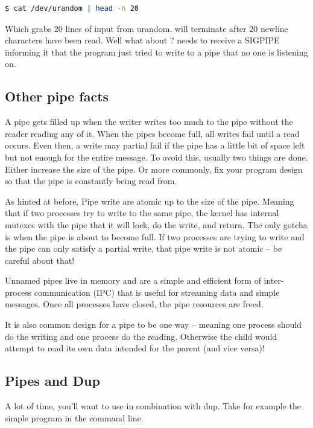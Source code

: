 \begin{lstlisting}[language=bash]
$ cat /dev/urandom | head -n 20
\end{lstlisting}
Which grabs 20 lines of input from urandom.  will terminate after 20 newline characters have been read. Well what about ?
 needs to receive a SIGPIPE informing it that the program just tried to write to a pipe that no one is listening on.

\subsection{Other pipe facts}

A pipe gets filled up when the writer writes too much to the pipe without the reader reading any of it. When the pipes become full, all writes fail until a read occurs. Even then, a write may partial fail if the pipe has a little bit of space left but not enough for the entire message. To avoid this, usually two things are done. Either increase the size of the pipe. Or more commonly, fix your program design so that the pipe is constantly being read from.

As hinted at before, Pipe write are atomic up to the size of the pipe. Meaning that if two processes try to write to the same pipe, the kernel has internal mutexes with the pipe that it will lock, do the write, and return. The only gotcha is when the pipe is about to become full. If two processes are trying to write and the pipe can only satisfy a partial write, that pipe write is not atomic -- be careful about that!

Unnamed pipes live in memory and are a simple and efficient form of inter-process communication (IPC) that is useful for streaming data and simple messages. Once all processes have closed, the pipe resources are freed.

It is also common design for a pipe to be one way -- meaning one process should do the writing and one process do the reading. Otherwise the child would attempt to read its own data intended for the parent (and vice versa)!

\subsection{Pipes and Dup}

A lot of time, you'll want to use  in combination with dup.
Take for example the simple program in the command line.

